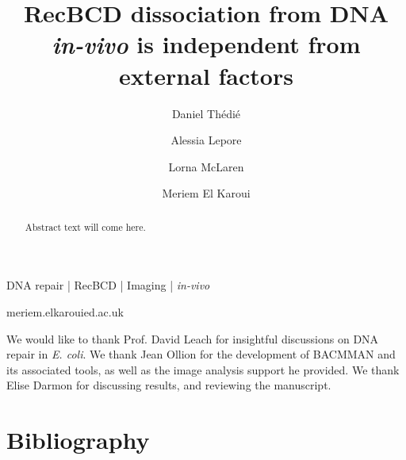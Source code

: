 \documentclass[times, twoside]{zHenriquesLab-StyleBioRxiv}
\begin{document}
\title{RecBCD dissociation from DNA \emph{in-vivo} is independent from external factors}
\shorttitle{}

\author[1]{Daniel Thédié}
\author[2]{Alessia Lepore}
\author[1]{Lorna McLaren}
\author[1]{Meriem El Karoui}



\maketitle

\begin{abstract}
Abstract text will come here.
\end{abstract}

\begin{keywords}
DNA repair | RecBCD | Imaging | \emph{in-vivo}
\end{keywords}

\begin{corrauthor}
meriem.elkaroui\at ed.ac.uk
\end{corrauthor}











\begin{acknowledgements}
We would like to thank Prof. David Leach for insightful discussions on DNA repair in \emph{E. coli}. We thank Jean Ollion for the development of BACMMAN and its associated tools, as well as the image analysis support he provided. We thank Elise Darmon for discussing results, and reviewing the manuscript.
\end{acknowledgements}

\section*{Bibliography}


\onecolumn
\newpage


\end{document}
